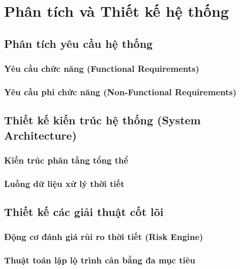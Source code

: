 \chapter{Phân tích và Thiết kế hệ thống}
\label{ch:architecture}

\section{Phân tích yêu cầu hệ thống}
\subsection{Yêu cầu chức năng (Functional Requirements)}

\subsection{Yêu cầu phi chức năng (Non-Functional Requirements)}

\section{Thiết kế kiến trúc hệ thống (System Architecture)}
\subsection{Kiến trúc phân tầng tổng thể}

\subsection{Luồng dữ liệu xử lý thời tiết}

\section{Thiết kế các giải thuật cốt lõi}
\subsection{Động cơ đánh giá rủi ro thời tiết (Risk Engine)}

\subsection{Thuật toán lập lộ trình cân bằng đa mục tiêu}

